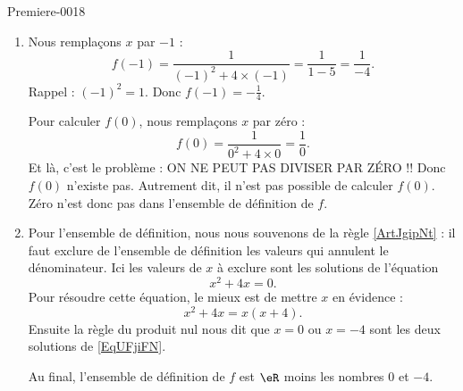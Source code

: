
\begin{corrige}{Premiere-0018}

    \begin{enumerate}
        \item
            Nous remplaçons \( x\) par \( -1\) :
            \begin{equation}
                f(-1)=\frac{1}{ (-1)^2+4\times (-1) }=\frac{1}{ 1-5 }=\frac{1}{ -4 }.
            \end{equation}
            Rappel : \( (-1)^2=1\). Donc \( f(-1)=-\frac{1}{ 4 }\).

            Pour calculer \( f(0)\), nous remplaçons \( x\) par zéro :
            \begin{equation}
                f(0)=\frac{1}{  0^2+4\times 0 }=\frac{1}{ 0 }.
            \end{equation}
            Et là, c'est le problème : ON NE PEUT PAS DIVISER PAR ZÉRO !! Donc \( f(0)\) n'existe pas. Autrement dit, il n'est pas possible de calculer \( f(0)\). Zéro n'est donc pas dans l'ensemble de définition de \( f\).

        \item
            Pour l'ensemble de définition, nous nous souvenons de la règle \ref{ArtJgipNt} : il faut exclure de l'ensemble de définition les valeurs qui annulent le dénominateur. Ici les valeurs de \( x\) à exclure sont les solutions de l'équation
            \begin{equation}    \label{EqUFjiFN}
                x^2+4x=0.
            \end{equation}
            Pour résoudre cette équation, le mieux est de mettre \( x\) en évidence :
            \begin{equation}
                x^2+4x=x(x+4).
            \end{equation}
            Ensuite la règle du produit nul nous dit que \( x=0\) ou \( x=-4\) sont les deux solutions de \eqref{EqUFjiFN}.

            Au final, l'ensemble de définition de \( f\) est \( \eR\) moins les nombres \( 0\) et \( -4\).
    \end{enumerate}

\end{corrige}
